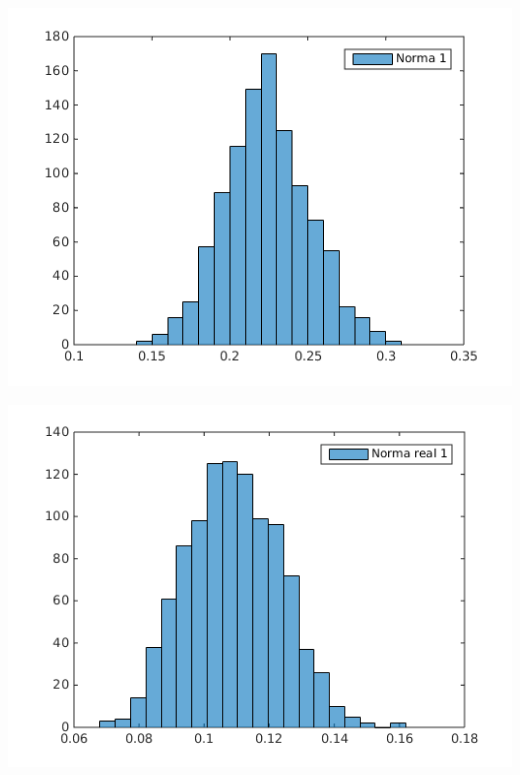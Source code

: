 \begin{frame}{}
\begin{columns}[T]
      \begin{column}{.56\textwidth}
        \begin{center}
          \advance\leftskip-0.2cm
          \includegraphics[scale=0.3]{./figures/norm1_1024_12.png}
        \end{center}
        
        \begin{center}
          \advance\leftskip-0.2cm
          \includegraphics[scale=0.3]{./figures/norm1_r2_16_4096_mul.png}
        \end{center}
        
      \end{column}
    \end{columns}
\end{frame}


